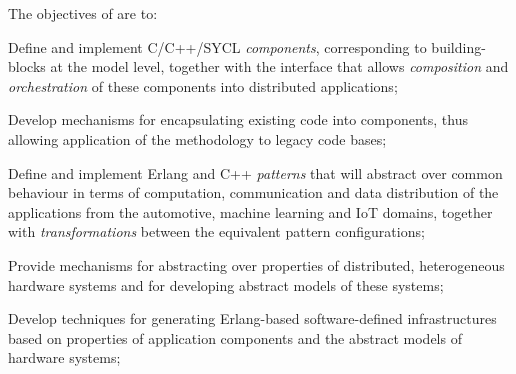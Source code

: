 \addtocounter{wpno}{1}
\begin{Workpackage}{\thewpno}
\WPTitle{\wpname{\thewpno}}

\begin{WPObjectives}
The objectives of \theWP{} are to:
\begin{compactitem}
\item Define and implement C/C++/SYCL \emph{components}, corresponding to building-blocks at the model level, together with the interface that allows \emph{composition} and \emph{orchestration} of these components into distributed applications;
\item Develop mechanisms for encapsulating existing code into components, thus allowing application of the \TheProject{} methodology to legacy code bases;
\item Define and implement Erlang and C++ \emph{patterns} that will abstract over common behaviour in terms of computation, communication and data distribution of the applications from the automotive, machine learning and IoT domains, together with \emph{transformations} between the equivalent pattern configurations;
\item Provide mechanisms for abstracting over properties of distributed, heterogeneous hardware systems and for developing abstract models of these systems;
\item Develop techniques for generating Erlang-based software-defined infrastructures based on properties of application components and the abstract models of hardware systems;
\end{compactitem}
\end{WPObjectives}


\end{Workpackage}
